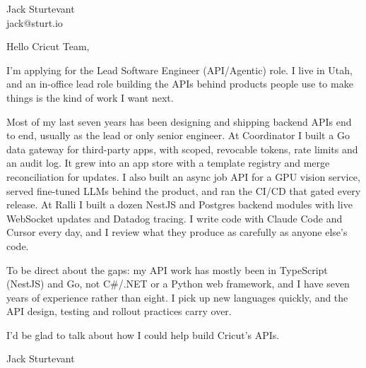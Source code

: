 \documentclass[11pt]{article}
\begin{document}
\raggedright

{\namefont\fontsize{20pt}{24pt}\selectfont Jack Sturtevant}\\[-0.3em]
jack@sturt.io

\vspace{1.2em}

Hello Cricut Team,

I'm applying for the Lead Software Engineer (API/Agentic) role. I live in Utah, and an in-office lead role building the APIs behind products people use to make things is the kind of work I want next.

Most of my last seven years has been designing and shipping backend APIs end to end, usually as the lead or only senior engineer. At Coordinator I built a Go data gateway for third-party apps, with scoped, revocable tokens, rate limits and an audit log. It grew into an app store with a template registry and merge reconciliation for updates. I also built an async job API for a GPU vision service, served fine-tuned LLMs behind the product, and ran the CI/CD that gated every release. At Ralli I built a dozen NestJS and Postgres backend modules with live WebSocket updates and Datadog tracing. I write code with Claude Code and Cursor every day, and I review what they produce as carefully as anyone else's code.

To be direct about the gaps: my API work has mostly been in TypeScript (NestJS) and Go, not C\#/.NET or a Python web framework, and I have seven years of experience rather than eight. I pick up new languages quickly, and the API design, testing and rollout practices carry over.

I'd be glad to talk about how I could help build Cricut's APIs.

\vspace{0.6em}
Jack Sturtevant
\end{document}
